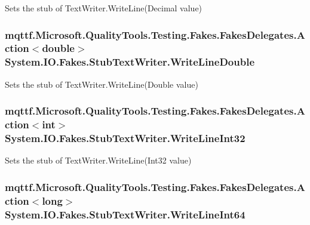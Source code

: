 Sets the stub of Text\-Writer.\-Write\-Line(\-Decimal value)

\hypertarget{class_system_1_1_i_o_1_1_fakes_1_1_stub_text_writer_a5281aa5b23a6ed18ac6ee084a9d1a95c}{
\subsubsection[{Write\-Line\-Double}]{\setlength{\rightskip}{0pt plus 5cm}mqttf.\-Microsoft.\-Quality\-Tools.\-Testing.\-Fakes.\-Fakes\-Delegates.\-Action$<$double$>$ System.\-I\-O.\-Fakes.\-Stub\-Text\-Writer.\-Write\-Line\-Double}}\label{class_system_1_1_i_o_1_1_fakes_1_1_stub_text_writer_a5281aa5b23a6ed18ac6ee084a9d1a95c}


Sets the stub of Text\-Writer.\-Write\-Line(\-Double value)

\hypertarget{class_system_1_1_i_o_1_1_fakes_1_1_stub_text_writer_a9c53af179427d822be50b0b607ebf3d3}{
\subsubsection[{Write\-Line\-Int32}]{\setlength{\rightskip}{0pt plus 5cm}mqttf.\-Microsoft.\-Quality\-Tools.\-Testing.\-Fakes.\-Fakes\-Delegates.\-Action$<$int$>$ System.\-I\-O.\-Fakes.\-Stub\-Text\-Writer.\-Write\-Line\-Int32}}\label{class_system_1_1_i_o_1_1_fakes_1_1_stub_text_writer_a9c53af179427d822be50b0b607ebf3d3}


Sets the stub of Text\-Writer.\-Write\-Line(\-Int32 value)

\hypertarget{class_system_1_1_i_o_1_1_fakes_1_1_stub_text_writer_a2132dd464ec71a40c9add0e5be560ad0}{
\subsubsection[{Write\-Line\-Int64}]{\setlength{\rightskip}{0pt plus 5cm}mqttf.\-Microsoft.\-Quality\-Tools.\-Testing.\-Fakes.\-Fakes\-Delegates.\-Action$<$long$>$ System.\-I\-O.\-Fakes.\-Stub\-Text\-Writer.\-Write\-Line\-Int64}}\label{class_system_1_1_i_o_1_1_fakes_1_1_stub_text_writer_a2132dd464ec71a40c9add0e5be560ad0}


